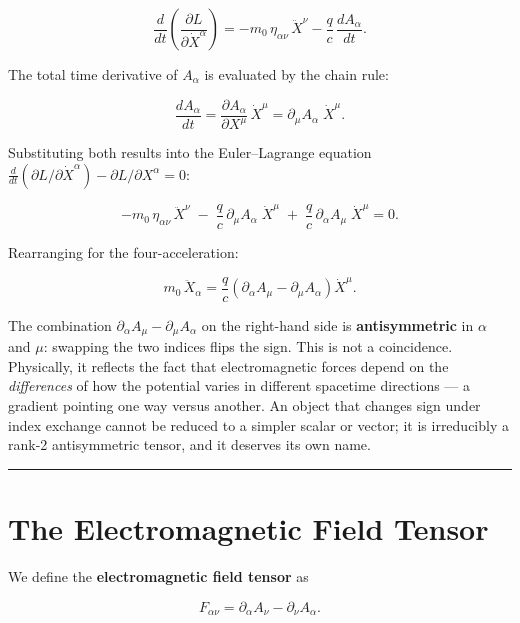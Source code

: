 \begin{equation}
\frac{d}{dt}\!\left(\frac{\partial L}{\partial \dot{X}^\alpha}\right)
= -m_0\,\eta_{\alpha\nu}\,\ddot{X}^\nu - \frac{q}{c}\,\frac{dA_\alpha}{dt}.
\end{equation}

The total time derivative of $A_\alpha$ is evaluated by the chain rule:

\begin{equation}
\frac{dA_\alpha}{dt} = \frac{\partial A_\alpha}{\partial X^\mu}\,\dot{X}^\mu = \partial_\mu A_\alpha\;\dot{X}^\mu.
\end{equation}

Substituting both results into the Euler--Lagrange equation $\frac{d}{dt}(\partial L/\partial\dot{X}^\alpha) - \partial L/\partial X^\alpha = 0$:

\begin{equation}
-m_0\,\eta_{\alpha\nu}\,\ddot{X}^\nu
\;-\; \frac{q}{c}\,\partial_\mu A_\alpha\;\dot{X}^\mu
\;+\; \frac{q}{c}\,\partial_\alpha A_\mu\;\dot{X}^\mu = 0.
\end{equation}

Rearranging for the four-acceleration:

\begin{equation}
m_0\,\ddot{X}_\alpha = \frac{q}{c}\left(\partial_\alpha A_\mu - \partial_\mu A_\alpha\right)\dot{X}^\mu.
\end{equation}

The combination $\partial_\alpha A_\mu - \partial_\mu A_\alpha$ on the right-hand side is \textbf{antisymmetric} in $\alpha$ and $\mu$: swapping the two indices flips the sign. This is not a coincidence. Physically, it reflects the fact that electromagnetic forces depend on the \emph{differences} of how the potential varies in different spacetime directions --- a gradient pointing one way versus another. An object that changes sign under index exchange cannot be reduced to a simpler scalar or vector; it is irreducibly a rank-2 antisymmetric tensor, and it deserves its own name.

\hrule
\vspace{1em}

\section{The Electromagnetic Field Tensor}

We define the \textbf{electromagnetic field tensor} as

\begin{equation}
\boxed{F_{\alpha\nu} = \partial_\alpha A_\nu - \partial_\nu A_\alpha.}
\end{equation}

